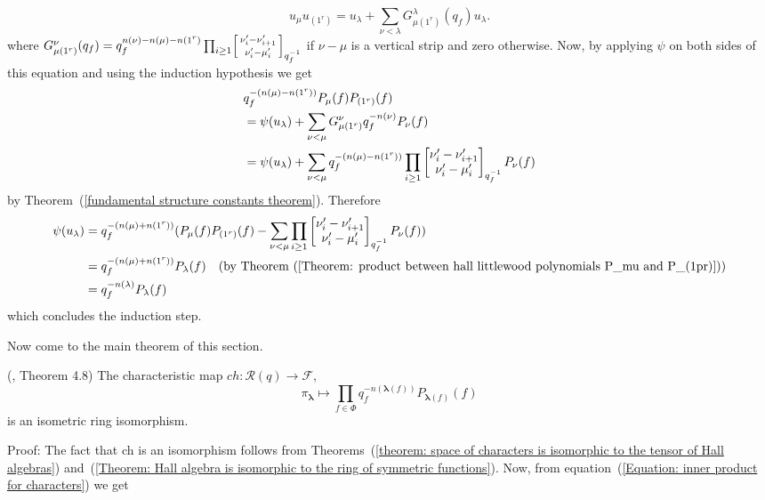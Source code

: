 \begin{equation}
    u_\mu u_{(1^r)}= u_\lambda +\sum_{\nu<\lambda}G_{\mu(1^r)}^\lambda(q_f) u_\lambda.
\end{equation}
where $G_{\mu(1^r)}^\nu(q_f)=q_f^{n(\nu)-n(\mu)-n(1^r)}\prod_{i\geq1}\begin{bsmallmatrix} \nu_i^\prime-\nu_{i+1}^\prime\\\nu_i^\prime-\mu_i^\prime\end{bsmallmatrix}_{q_f^{-1}}$ if $\nu-\mu$ is a vertical strip and zero otherwise. Now, by applying $\psi$ on both sides of this equation and using the induction hypothesis we get
\begin{equation}
\begin{split}
     &q_f^{-(n(\mu)-n(1^r))}P_\mu(f)P_{(1^r)}(f)\\
     &=\psi(u_\lambda)+\sum_{\nu<\mu}G_{\mu(1^r)}^\nu q_f^{-n(\nu)}P_\nu(f)\\
     &=\psi(u_\lambda)+\sum_{\nu<\mu}q_f^{-(n(\mu)-n(1^r))}\prod_{i\geq1}\begin{bmatrix} \nu_i^\prime-\nu_{i+1}^\prime\\\nu_i^\prime-\mu_i^\prime\end{bmatrix}_{q_f^{-1}} P_\nu(f)
\end{split}
\end{equation}
by Theorem~(\ref{fundamental structure constants theorem}). Therefore
\begin{equation}
\begin{split}
     \psi(u_\lambda) &= q_f^{-(n(\mu)+n(1^r))}(P_\mu(f)P_{(1^r)}(f)-\sum_{\nu<\mu}\prod_{i\geq1}\begin{bmatrix} \nu_i^\prime-\nu_{i+1}^\prime\\\nu_i^\prime-\mu_i^\prime\end{bmatrix}_{q_f^{-1}} P_\nu(f))\\
    &=q_f^{-(n(\mu)+n(1^r))}P_\lambda(f)\quad(\text{by Theorem~(\ref{Theorem: product between hall littlewood polynomials P_mu and P_(1pr)})})\\
    &=q_f^{-n(\lambda)}P_\lambda(f)
\end{split}
\end{equation}
which concludes the induction step.\par
Now come to the main theorem of this section.
\begin{dang}
  \begin{theorem}\label{Theorem: the characteristic map}(\cite{jing1991vertex}, Theorem 4.8)
    The characteristic map $ch: \mathcal{R}(q)\rightarrow \mathcal{F}$,
    \begin{equation}
        \pi_{\boldsymbol{\lambda}}\mapsto \prod_{f\in\Phi}q_f^{-n(\boldsymbol{\lambda}(f))}P_{\boldsymbol{\lambda}(f)}(f)
    \end{equation}
    is an isometric ring isomorphism.
  \end{theorem}
\end{dang}
Proof: The fact that ch is an isomorphism follows from Theorems~(\ref{theorem: space of characters is isomorphic to the tensor of Hall algebras}) and~(\ref{Theorem: Hall algebra is isomorphic to the ring of symmetric functions}). Now, from equation~(\ref{Equation: inner product for characters}) we get
